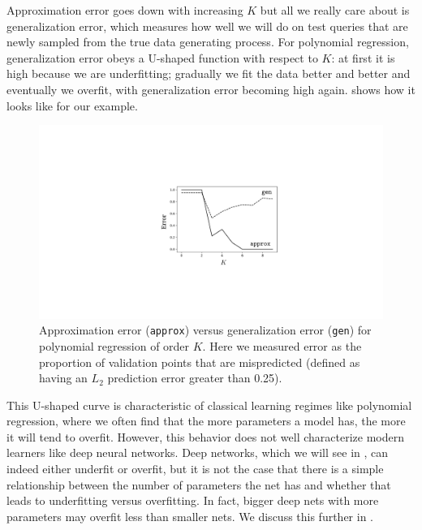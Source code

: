 Approximation error goes down with increasing $K$ but all we really care about is generalization error, which measures how well we will do on test queries that are newly sampled from the true data generating process. For polynomial regression, generalization error obeys a U-shaped function with respect to $K$: at first it is high because we are underfitting; gradually we fit the data better and better and eventually we overfit, with generalization error becoming high again. \Fig{\ref{fig:under_and_overfitting_vs_polyK}} shows how it looks like for our example.
\begin{figure}[h]
    \centerline{
    \includegraphics[width=0.48\linewidth]{./figures/problem_of_generalization/under_and_overfitting_vs_polyK.pdf}
    }
    \caption{Approximation error (\texttt{approx}) versus generalization error (\texttt{gen}) for polynomial regression of order $K$. Here we measured error as the proportion of validation points that are mispredicted (defined as having an $L_2$ prediction error greater than 0.25).}
    \label{fig:under_and_overfitting_vs_polyK}
\end{figure} %

This U-shaped curve is characteristic of classical learning regimes like polynomial regression, where we often find that the more parameters a model has, the more it will tend to overfit. However, this behavior does not well characterize modern learners like deep neural networks. Deep networks, which we will see in \chap{\ref{chapter:neural_nets}}, can indeed either underfit or overfit, but it is not the case that there is a simple relationship between the number of parameters the net has and whether that leads to underfitting versus overfitting. In fact, bigger deep nets with more parameters may overfit less than smaller nets. We discuss this further in \sect{\ref{sect:problem_of_generalization:rethinking_generalization}}. 


